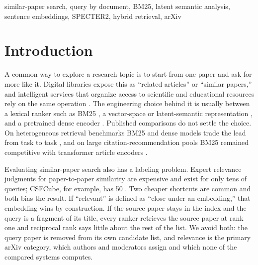 \documentclass[conference]{IEEEtran}
\begin{document}
\begin{IEEEkeywords}
similar-paper search, query by document, BM25, latent semantic analysis, sentence embeddings, SPECTER2, hybrid retrieval, arXiv
\end{IEEEkeywords}

\section{Introduction}

A common way to explore a research topic is to start from one paper and ask for more like it. Digital libraries expose this as ``related articles'' or ``similar papers,'' and intelligent services that organize access to scientific and educational resources rely on the same operation \cite{batyrkhanov2022intelligent,serikbayeva2021access}. The engineering choice behind it is usually between a lexical ranker such as BM25 \cite{robertson2009bm25}, a vector-space or latent-semantic representation \cite{salton1988term,deerwester1990lsa}, and a pretrained dense encoder \cite{reimers2019sbert,cohan2020specter}. Published comparisons do not settle the choice. On heterogeneous retrieval benchmarks BM25 and dense models trade the lead from task to task \cite{thakur2021beir,muennighoff2023mteb}, and on large citation-recommendation pools BM25 remained competitive with transformer article encoders \cite{medic2022large}.

Evaluating similar-paper search also has a labeling problem. Expert relevance judgments for paper-to-paper similarity are expensive and exist for only tens of queries; CSFCube, for example, has 50 \cite{mysore2021csfcube}. Two cheaper shortcuts are common and both bias the result. If ``relevant'' is defined as ``close under an embedding,'' that embedding wins by construction. If the source paper stays in the index and the query is a fragment of its title, every ranker retrieves the source paper at rank one and reciprocal rank says little about the rest of the list. We avoid both: the query paper is removed from its own candidate list, and relevance is the primary arXiv category, which authors and moderators assign and which none of the compared systems computes.
\end{document}
